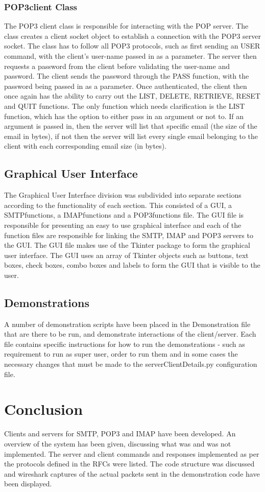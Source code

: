 \documentclass[11pt]{article}
\begin{document}
\begin{multicols}{2}
\subsubsection{POP3client Class}
The POP3 client class is responsible for interacting with the POP server. The class creates a client socket object to establish a connection with the POP3 server socket. The class has to follow all POP3 protocols, such as first sending an USER command, with the client's user-name passed in as a parameter. The server then requests a password from the client before validating the user-name and password. The client sends the password through the PASS function, with the password being passed in as a parameter. Once authenticated, the client then once again has the ability to carry out the LIST, DELETE, RETRIEVE, RESET and QUIT functions. The only function which needs clarification is the LIST function, which has the option to either pass in an argument or not to. If an argument is passed in, then the server will list that specific email (the size of the email in bytes), if not then the server will list every single email belonging to the client with each corresponding email size (in bytes).
\subsection{Graphical User Interface}
The Graphical User Interface division was subdivided into separate sections according to the functionality of each section. This consisted of a GUI, a SMTPfunctions, a IMAPfunctions and a POP3functions file. The GUI file is responsible for presenting an easy to use graphical interface and each of the function files are responsible for linking the SMTP, IMAP and POP3 servers to the GUI. The GUI file makes use of the Tkinter package to form the graphical user interface. The GUI uses an array of Tkinter objects such as buttons, text boxes, check boxes, combo boxes and labels to form the GUI that is visible to the user.

\subsection{Demonstrations}
A number of demonstration scripts have been placed in the Demonstration file that are there to be run, and demonstrate interactions of the client/server. Each file contains specific instructions for how to run the demonstrations - such as requirement to run as super user, order to run them and in some cases the necessary changes that must be made to the serverClientDetails.py configuration file.

\section{Conclusion}
Clients and servers for SMTP, POP3 and IMAP have been developed. An overview of the system has been given, discussing what was and was not implemented. The server and client commands and responses implemented as per the protocols defined in the RFCs were listed. The code structure was discussed and wireshark captures of the actual packets sent in the demonstration code have been displayed. 

\end{multicols}
\end{document}
